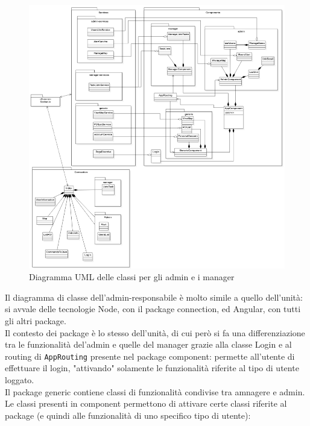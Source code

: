 \begin{figure}[H]
	\centering
	\includegraphics[scale=0.6]{res/images/UML_admin-manager.png}
	\caption{Diagramma UML delle classi per gli admin e i manager}
\end{figure}
Il diagramma di classe dell'admin-responsabile è molto simile a quello dell'unità: si avvale delle tecnologie Node, con il package connection, ed Angular, con tutti gli altri package.\\
Il contesto dei package è lo stesso dell'unità, di cui però si fa una differenziazione tra le funzionalità del'admin e quelle del manager grazie alla classe Login e al routing di \texttt{AppRouting} presente nel package component: permette all'utente di effettuare il login, "attivando" solamente le funzionalità riferite al tipo di utente loggato.\\
Il package generic contiene classi di funzionalità condivise tra amnagere e admin.\\
Le classi presenti in component permettono di attivare certe classi riferite al package (e quindi alle funzionalità di uno specifico tipo di utente):
